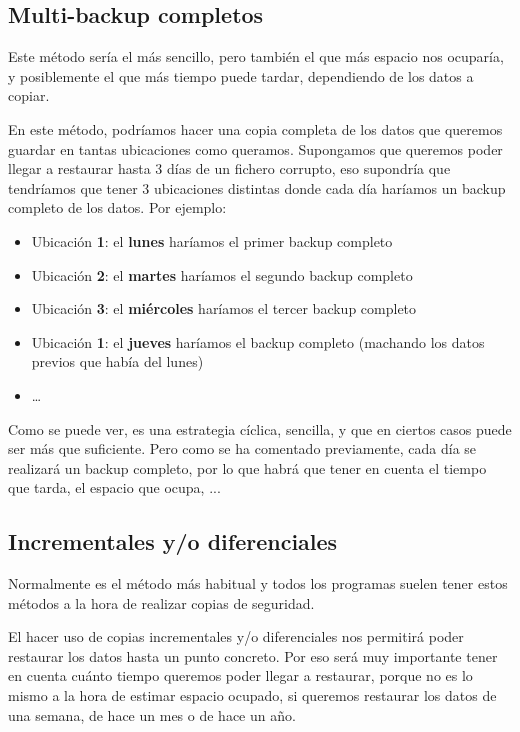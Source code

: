 \subsection{Multi-backup completos}
Este método sería el más sencillo, pero también el que más espacio nos ocuparía, y posiblemente el que más tiempo puede tardar, dependiendo de los datos a copiar.

En este método, podríamos hacer una copia completa de los datos que queremos guardar en tantas ubicaciones como queramos. Supongamos que queremos poder llegar a restaurar hasta 3 días de un fichero corrupto, eso supondría que tendríamos que tener 3 ubicaciones distintas donde cada día haríamos un backup completo de los datos. Por ejemplo:

\begin{itemize}
    \item Ubicación \textbf{1}: el \textbf{lunes} haríamos el primer backup completo
    \item Ubicación \textbf{2}: el \textbf{martes} haríamos el segundo backup completo
    \item Ubicación \textbf{3}: el \textbf{miércoles} haríamos el tercer backup completo
    \item Ubicación \textbf{1}: el \textbf{jueves} haríamos el backup completo (machando los datos previos que había del lunes)
    \item …
\end{itemize}

Como se puede ver, es una estrategia cíclica, sencilla, y que en ciertos casos puede ser más que suficiente. Pero como se ha comentado previamente, cada día se realizará un backup completo, por lo que habrá que tener en cuenta el tiempo que tarda, el espacio que ocupa, ...


\subsection{Incrementales y/o diferenciales}
Normalmente es el método más habitual y todos los programas suelen tener estos métodos a la hora de realizar copias de seguridad.

El hacer uso de copias incrementales y/o diferenciales nos permitirá poder restaurar los datos hasta un punto concreto. Por eso será muy importante tener en cuenta cuánto tiempo queremos poder llegar a restaurar, porque no es lo mismo a la hora de estimar espacio ocupado, si queremos restaurar los datos de una semana, de hace un mes o de hace un año.

